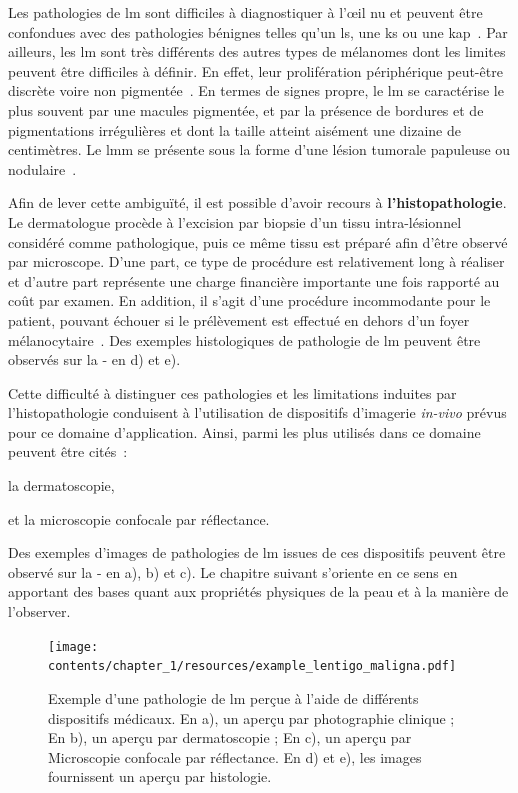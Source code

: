 Les pathologies de \gls{lm} sont difficiles à diagnostiquer à l’œil nu et peuvent être confondues avec des pathologies bénignes telles qu'un \gls{ls}, une \gls{ks} ou une \gls{kap}~\cite{LeDuff2014}. Par ailleurs, les \gls{lm} sont très différents des autres types de mélanomes dont les limites peuvent être difficiles à définir. En effet, leur prolifération périphérique peut-être discrète voire non pigmentée~\cite{LeGal2011}. En termes de signes propre, le \gls{lm} se caractérise le plus souvent par une macules pigmentée, et par la présence de bordures et de pigmentations irrégulières et dont la taille atteint aisément une dizaine de centimètres. Le \gls{lmm} se présente sous la forme d'une lésion tumorale papuleuse ou nodulaire~\cite{Mckenna2006, LeGal2011}.\par

Afin de lever cette ambiguïté, il est possible d'avoir recours à \textbf{l'histopathologie}. Le dermatologue procède à l'excision par biopsie d'un tissu intra-lésionnel considéré comme pathologique, puis ce même tissu est préparé afin d'être observé par microscope. D'une part, ce type de procédure est relativement long à réaliser et d'autre part représente une charge financière importante une fois rapporté au coût par examen. En addition, il s'agit d'une procédure incommodante pour le patient, pouvant échouer si le prélèvement est effectué en dehors d'un foyer mélanocytaire~\cite{LeGal2011}. Des exemples histologiques de pathologie de \gls{lm} peuvent être observés sur la  - en d) et e).\par

Cette difficulté à distinguer ces pathologies et les limitations induites par l'histopathologie conduisent à l'utilisation de dispositifs d'imagerie \textit{in-vivo} prévus pour ce domaine d'application. Ainsi, parmi les plus utilisés dans ce domaine peuvent être cités~:
\begin{inlinerate}
    \item la dermatoscopie,
    \item et la microscopie confocale par réflectance.
\end{inlinerate} Des exemples d'images de pathologies de \gls{lm} issues de ces dispositifs peuvent être observé sur la  - en a), b) et c). Le chapitre suivant s'oriente en ce sens en apportant des bases quant aux propriétés physiques de la peau et à la manière de l'observer.\par

\begin{figure}[H]
    \centering
    \texttt{[image: contents/chapter\_1/resources/example\_lentigo\_maligna.pdf]}
    \caption{Exemple d'une pathologie de \gls{lm} perçue à l'aide de différents dispositifs médicaux. En a), un aperçu par photographie clinique ; En b), un aperçu par dermatoscopie ; En c), un aperçu par Microscopie confocale par réflectance. En d) et e), les images fournissent un aperçu par histologie.}
    \label{fig:example_lentigo_maligna}
\end{figure}\par